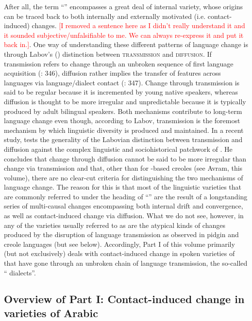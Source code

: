 \documentclass[output=paper]{langsci/langscibook}
\begin{document}
After all, the term ``'' encompasses a great deal of internal variety, whose origins can be traced back to both internally and externally motivated (i.e. contact-induced) changes. \textcolor{red}{[I removed a sentence here as I didn't really understand it and it sounded subjective/unfalsifiable to me. We can always re-express it and put it back in.]}. One way of understanding these different patterns of {language change} is through Labov's (\citeyear{Labov2007}) distinction between \textsc{transmission} and \textsc{diffusion}. If {transmission} refers to change through an unbroken sequence of first language acquisition (\citealt{Labov2007}: 346), {diffusion} rather implies the {transfer} of features across languages via language/{dialect contact} (\citealt{Labov2007}: 347). Change through {transmission} is said to be regular because it is incremented by young native speakers, whereas {diffusion} is thought to be more irregular and unpredictable because it is typically produced by adult bilingual speakers. Both mechanisms contribute to long-term {language change} even though, according to Labov, {transmission} is the foremost mechanism by which linguistic diversity is produced and maintained. In a recent study, \citet{Owens2018} tests the generality of the Labovian distinction between {transmission} and {diffusion} against the complex linguistic and sociohistorical patchwork of . He concludes that change through {diffusion} cannot be said to be more irregular than change via {transmission} and that, other than for -based creoles (see Avram, this volume), there are no clear-cut criteria for distinguishing the two mechanisms of {language change}. The reason for this is that most of the linguistic varieties that are commonly referred to under the heading of ``'' are the result of a longstanding series of multi-causal changes encompassing both internal drift and {convergence}, as well as contact-induced change via {diffusion}. What we do not see, however, in any of the varieties usually referred to as  are the atypical kinds of changes produced by the disruption of language {transmission} as observed in {pidgin} and {creole} languages (but see below). Accordingly, Part I of this volume primarily (but not exclusively) deals with contact-induced change in spoken varieties of  that have gone through an unbroken chain of language {transmission}, the so-called `` dialects''.


\subsection{Overview of Part I: Contact-induced change in varieties of Arabic}\label{intropartIoverview}
\end{document}
